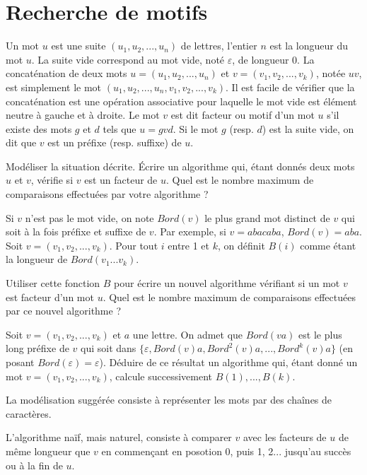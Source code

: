 \renewcommand{\SourceFile}{2-jouer-avec-les-mots/src/2-4.ml}

\section{Recherche de motifs}

Un mot $u$ est une suite $(u_1, u_2, ..., u_n)$ de lettres, l'entier $n$ est la longueur du mot $u$. La suite vide correspond au mot vide, noté $\varepsilon$, de longueur 0. La concaténation de deux mots $u=(u_1, u_2, ..., u_n)$ et $v=(v_1, v_2, ..., v_k)$, notée $uv$, est simplement le mot $(u_1, u_2, ..., u_n, v_1, v_2, ..., v_k)$. Il est facile de vérifier que la concaténation est une opération associative pour laquelle le mot vide est élément neutre à gauche et à droite. Le mot $v$ est dit facteur ou motif d'un mot $u$ s'il existe des mots $g$ et $d$ tels que $u=gvd$. Si le mot $g$ (resp. $d$) est la suite vide, on dit que $v$ est un préfixe (resp. suffixe) de $u$.

\Q
Modéliser la situation décrite. Écrire un algorithme qui, étant donnés deux mots $u$ et $v$, vérifie si $v$ est un facteur de $u$. Quel est le nombre maximum de comparaisons effectuées par votre algorithme ?

\Q
Si $v$ n'est pas le mot vide, on note $Bord(v)$ le plus grand mot distinct de $v$ qui soit à la fois préfixe et suffixe de $v$. Par exemple, si $v=abacaba$, $Bord(v)=aba$. Soit $v=(v_1, v_2, ..., v_k)$. Pour tout $i$ entre 1 et $k$, on définit $B(i)$ comme étant la longueur de $Bord(v_1 ... v_k)$.
\smallskip

Utiliser cette fonction $B$ pour écrire un nouvel algorithme vérifiant si un mot $v$ est facteur d'un mot $u$. Quel est le nombre maximum de comparaisons effectuées par ce nouvel algorithme ?

\Q
Soit $v=(v_1, v_2, ..., v_k)$ et $a$ une lettre. On admet que $Bord(va)$ est le plus long préfixe de $v$ qui soit dans $\{\varepsilon, Bord(v)a,Bord^2(v)a, ..., Bord^k(v)a\}$ (en posant $Bord(\varepsilon)=\varepsilon$). Déduire de ce résultat un algorithme qui, étant donné un mot $v=(v_1, v_2, ..., v_k)$, calcule successivement $B(1), ..., B(k)$.

\newpage

\Corrige

\Q
La modélisation suggérée consiste à représenter les mots par des chaînes de caractères.
\medskip

L'algorithme naïf, mais naturel, consiste à comparer $v$ avec les facteurs de $u$ de même longueur que $v$ en commençant en posotion 0, puis 1, 2... jusqu'au succès ou à la fin de $u$.

